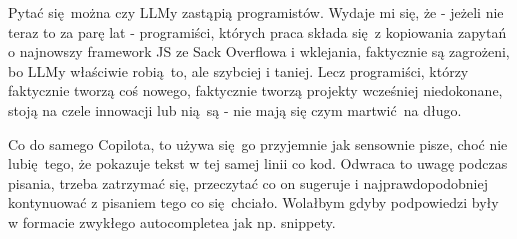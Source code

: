 Pytać się można czy LLMy zastąpią programistów. Wydaje mi się, że - jeżeli nie teraz to za parę lat - programiści, których praca składa się z kopiowania zapytań o najnowszy framework JS ze Sack Overflowa i wklejania, faktycznie są zagrożeni, bo LLMy właściwie robią to, ale szybciej i taniej. Lecz programiści, którzy faktycznie tworzą coś nowego, faktycznie tworzą projekty wcześniej niedokonane, stoją na czele innowacji lub nią są - nie mają się czym martwić na długo.

Co do samego Copilota, to używa się go przyjemnie jak sensownie pisze, choć nie lubię tego, że pokazuje tekst w tej samej linii co kod. Odwraca to uwagę podczas pisania, trzeba zatrzymać się, przeczytać co on sugeruje i najprawdopodobniej kontynuować z pisaniem tego co się chciało. Wolałbym gdyby podpowiedzi były w formacie zwykłego autocompletea jak np. snippety. 

